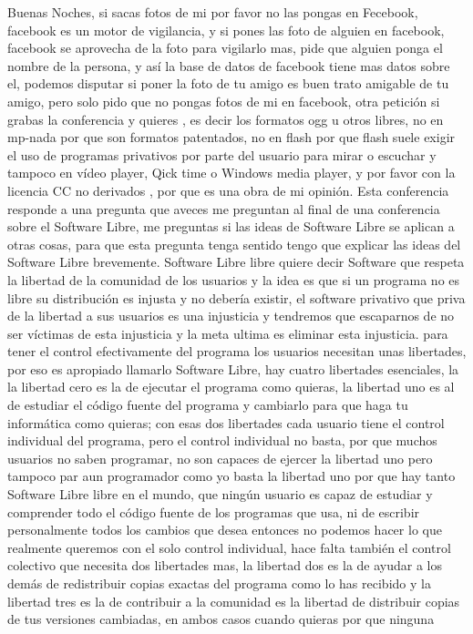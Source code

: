 \begin{multicols}{2}
Buenas Noches, si sacas fotos de mi por favor no las pongas en Fecebook, facebook es un motor de vigilancia, y si pones las foto de alguien en facebook, facebook se aprovecha de la foto para vigilarlo mas, pide que alguien ponga el nombre de la persona, y así la base de datos de facebook tiene mas datos sobre el, podemos disputar si poner la foto de tu amigo es buen trato amigable de tu amigo, pero solo pido que no pongas fotos de mi en facebook, otra petición si grabas la conferencia y quieres {\em {\color{introcolor}{distribuir copias por favor únicamente en los formatos favorables al Software Libre}}}, es decir los formatos ogg u otros libres, no en mp-nada por que son formatos patentados, no en flash por que flash suele exigir el uso de programas privativos por parte del usuario para mirar o escuchar y tampoco en vídeo player, Qick time o Windows media player, y por favor con la licencia CC no derivados , por que es una obra de mi opinión.
Esta conferencia responde a una pregunta que aveces me preguntan al final de una conferencia sobre el Software Libre, me preguntas si las ideas de Software Libre se aplican a otras cosas,  para que esta pregunta tenga sentido tengo que explicar las ideas del Software Libre brevemente.
Software Libre libre quiere decir Software que respeta la libertad de la comunidad de los usuarios y la idea es que si un programa no es libre su distribución es injusta y no debería existir, el software privativo que priva de la libertad a sus usuarios es una injusticia y tendremos que escaparnos de no ser víctimas de esta injusticia y la meta ultima es eliminar esta injusticia.
{\em {\color{introcolor}{Con el software solo hay dos posibilidades o los usuarios tienen el control del programa o el programa tiene el control de los usuarios,}}} para tener el control efectivamente del programa los usuarios necesitan unas libertades, por eso es apropiado llamarlo Software Libre, hay cuatro libertades esenciales, la la libertad cero es la de ejecutar el programa como quieras, la libertad uno es al de estudiar el código fuente del programa y cambiarlo para que haga tu informática como quieras; con esas dos libertades cada usuario tiene el control individual del programa, pero el control individual no basta, por que muchos usuarios no saben programar, no son capaces de ejercer la libertad uno pero tampoco par aun programador como yo basta la libertad uno  por que hay tanto Software Libre libre en el mundo, que ningún usuario es capaz de estudiar y comprender   todo el código fuente de los programas que usa, ni de escribir personalmente todos los cambios que desea entonces no podemos hacer lo que realmente queremos con el solo control individual, hace falta también el control colectivo que necesita dos libertades mas, la libertad dos es la de ayudar a los demás de redistribuir copias exactas del programa como lo has recibido y la libertad tres es la de contribuir a la comunidad es la libertad de distribuir copias de tus versiones cambiadas, en ambos casos cuando quieras por que ninguna


\end{multicols}
